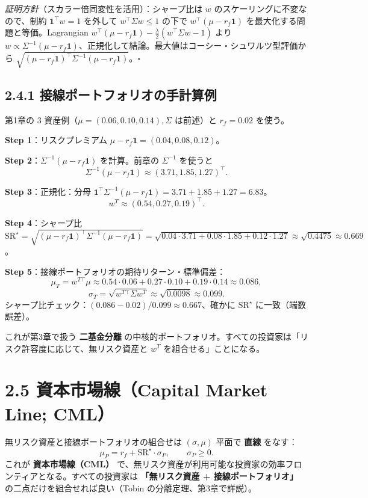\documentclass[11pt,a4paper]{report}
\begin{document}
\emph{証明方針}（スカラー倍同変性を活用）：シャープ比は $w$ のスケーリングに不変なので、制約 $\mathbf{1}^\top w = 1$ を外して $w^\top\Sigma w \le 1$ の下で $w^\top(\mu - r_f \mathbf{1})$ を最大化する問題と等価。Lagrangian $w^\top(\mu - r_f\mathbf{1}) - \tfrac{\lambda}{2}(w^\top \Sigma w - 1)$ より $w \propto \Sigma^{-1}(\mu - r_f\mathbf{1})$、正規化して結論。最大値はコーシー・シュワルツ型評価から $\sqrt{(\mu-r_f\mathbf{1})^\top \Sigma^{-1}(\mu-r_f\mathbf{1})}$。$\square$

\subsection{2.4.1 接線ポートフォリオの手計算例}

第1章の 3 資産例（$\mu = (0.06, 0.10, 0.14), \Sigma$ は前述）と $r_f = 0.02$ を使う。

\textbf{Step 1}：リスクプレミアム $\mu - r_f \mathbf{1} = (0.04, 0.08, 0.12)$。

\textbf{Step 2}：$\Sigma^{-1}(\mu - r_f \mathbf{1})$ を計算。前章の $\Sigma^{-1}$ を使うと \[ \Sigma^{-1}(\mu - r_f \mathbf{1}) \approx (3.71, 1.85, 1.27)^\top. \]

\textbf{Step 3}：正規化：分母 $\mathbf{1}^\top \Sigma^{-1}(\mu - r_f \mathbf{1}) = 3.71 + 1.85 + 1.27 = 6.83$。 \[ w^T \approx (0.54, 0.27, 0.19)^\top. \]

\textbf{Step 4}：シャープ比 $\mathrm{SR}^\star = \sqrt{(\mu-r_f\mathbf{1})^\top \Sigma^{-1}(\mu-r_f\mathbf{1})} = \sqrt{0.04 \cdot 3.71 + 0.08 \cdot 1.85 + 0.12 \cdot 1.27} \approx \sqrt{0.4475} \approx 0.669$。

\textbf{Step 5}：接線ポートフォリオの期待リターン・標準偏差： \[ \mu_T = w^{T\top} \mu \approx 0.54 \cdot 0.06 + 0.27 \cdot 0.10 + 0.19 \cdot 0.14 \approx 0.086, \] \[ \sigma_T = \sqrt{w^{T\top} \Sigma w^T} \approx \sqrt{0.0098} \approx 0.099. \] シャープ比チェック：$(0.086 - 0.02)/0.099 \approx 0.667$、確かに $\mathrm{SR}^\star$ に一致（端数誤差）。

これが第3章で扱う \textbf{二基金分離} の中核的ポートフォリオ。すべての投資家は「リスク許容度に応じて、無リスク資産と $w^T$ を組合せる」ことになる。

\section{2.5 資本市場線（Capital Market Line; CML）}

無リスク資産と接線ポートフォリオの組合せは $(\sigma, \mu)$ 平面で \textbf{直線} をなす： \[ \mu_P = r_f + \mathrm{SR}^\star \cdot \sigma_P, \qquad \sigma_P \ge 0. \] これが \textbf{資本市場線（CML）} で、無リスク資産が利用可能な投資家の効率フロンティアとなる。すべての投資家は \textbf{「無リスク資産 + 接線ポートフォリオ」} の二点だけを組合せれば良い（Tobin の分離定理、第3章で詳説）。
\end{document}
